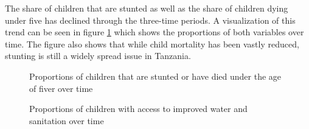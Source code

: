 \documentclass[a4paper, 11pt]{article} %
\begin{document}
The share of children that are stunted as well as the share of children dying under five has declined through the three-time periods. A visualization of this trend can be seen in figure \ref{fig:stunting_dead5_proportion} which shows the proportions of both variables over time. The figure also shows that while child mortality has been vastly reduced, stunting is still a widely spread issue in Tanzania.

\begin{figure}[h]
    \centering
    \qquad
    \caption{Proportions of children that are stunted or have died under the age of fiver over time}%
    \label{fig:stunting_dead5_proportion}%
\end{figure}

\begin{figure}[!h]
    \centering
    \qquad
    \caption{Proportions of children with access to improved water and sanitation over time}%
    \label{fig:water_sanitation_proportion}%
\end{figure}
\end{document}
